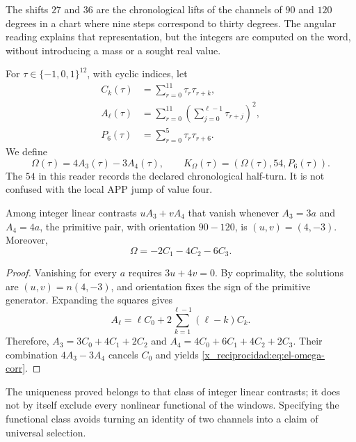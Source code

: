 The shifts \(27\) and \(36\) are the chronological lifts
of the channels of \(90\) and \(120\) degrees in a chart
where nine steps correspond to thirty degrees. The angular reading
explains that representation, but the integers are computed on the
word, without introducing a mass or a sought real value.

\begin{definition}
For \(\tau\in\{-1,0,1\}^{12}\), with cyclic indices, let
\begin{align*}
 C_k(\tau)&=\sum_{r=0}^{11}\tau_r\tau_{r+k},\\
 A_\ell(\tau)&=\sum_{r=0}^{11}
           \left(\sum_{j=0}^{\ell-1}\tau_{r+j}\right)^2,\\
 P_6(\tau)&=\sum_{r=0}^{5}\tau_r\tau_{r+6}.
\end{align*}
We define
\begin{equation}
 \Omega(\tau)=4A_3(\tau)-3A_4(\tau),\qquad
 K_\Omega(\tau)=(\Omega(\tau),54,P_6(\tau)).
 \label{x_reciprocidad:eq:el-komega}
\end{equation}
The \(54\) in this reader records the declared chronological half-turn.
It is not confused with the local APP jump of value four.
\end{definition}

\begin{lemma}
Among integer linear contrasts \(uA_3+vA_4\) that vanish
whenever \(A_3=3a\) and \(A_4=4a\), the primitive pair, with
orientation \(90-120\), is \((u,v)=(4,-3)\). Moreover,
\begin{equation}
 \Omega=-2C_1-4C_2-6C_3.
 \label{x_reciprocidad:eq:el-omega-corr}
\end{equation}
\end{lemma}
\begin{proof}
Vanishing for every \(a\) requires \(3u+4v=0\). By coprimality,
the solutions are \((u,v)=n(4,-3)\), and orientation fixes the sign
of the primitive generator. Expanding the squares gives
\[
 A_\ell=\ell C_0+2\sum_{k=1}^{\ell-1}(\ell-k)C_k.
\]
Therefore,
\(A_3=3C_0+4C_1+2C_2\) and
\(A_4=4C_0+6C_1+4C_2+2C_3\). Their combination \(4A_3-3A_4\)
cancels \(C_0\) and yields \eqref{x_reciprocidad:eq:el-omega-corr}.
\end{proof}

The uniqueness proved belongs to that class of integer linear
contrasts; it does not by itself exclude every nonlinear functional of the windows.
Specifying the functional class avoids turning an identity
of two channels into a claim of universal selection.

